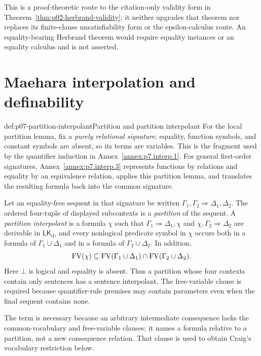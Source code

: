 This is a proof-theoretic route to the citation-only validity form in
Theorem~\ref{thm:p02-herbrand-validity}; it neither upgrades that theorem nor
replaces its finite-clause unsatisfiability form or the epsilon-calculus
route.  An equality-bearing Herbrand theorem would require equality instances
or an equality calculus and is not asserted.

\section{Maehara interpolation and definability}

\begin{hbdefinition}{def:p07-partition-interpolant}{Partition and partition interpolant}
For the local partition lemma, fix a \emph{purely relational signature}:
equality, function symbols, and constant symbols are absent, so its terms are
variables.  This is the fragment used by the quantifier induction in
Annex~\ref{annex:p7.interp.1}.  For general first-order signatures,
Annex~\ref{annex:p7.interp.3} represents functions by relations and equality
by an equivalence relation, applies this partition lemma, and translates
the resulting formula back into the common signature.

Let an equality-free sequent in that signature be written
\(\Gamma_1,\Gamma_2\Rightarrow\Delta_1,\Delta_2\).  The ordered four-tuple of
displayed subcontexts is a \emph{partition} of the sequent.  A
\emph{partition interpolant} is a formula \(\chi\) such that
\(\Gamma_1\Rightarrow\Delta_1,\chi\) and
\(\chi,\Gamma_2\Rightarrow\Delta_2\) are derivable in
\(\mathsf{LK}_{\mathrm d}\), and every nonlogical
predicate symbol in \(\chi\) occurs both in a formula
of \(\Gamma_1\cup\Delta_1\) and in a formula of
\(\Gamma_2\cup\Delta_2\).  In addition,
\[
 \operatorname{FV}(\chi)\subseteq
 \operatorname{FV}(\Gamma_1\cup\Delta_1)\cap
 \operatorname{FV}(\Gamma_2\cup\Delta_2).
\]
Here \(\bot\) is logical and equality is absent.  Thus a partition whose four
contexts contain only sentences has a sentence interpolant.  The free-variable
clause is required because quantifier-rule premises may contain parameters even
when the final sequent contains none.

The term is necessary because an arbitrary intermediate consequence lacks
the common-vocabulary and free-variable clauses; it names a formula relative to a partition,
not a new consequence relation.  That clause is used to obtain Craig's
vocabulary restriction below.
\end{hbdefinition}

